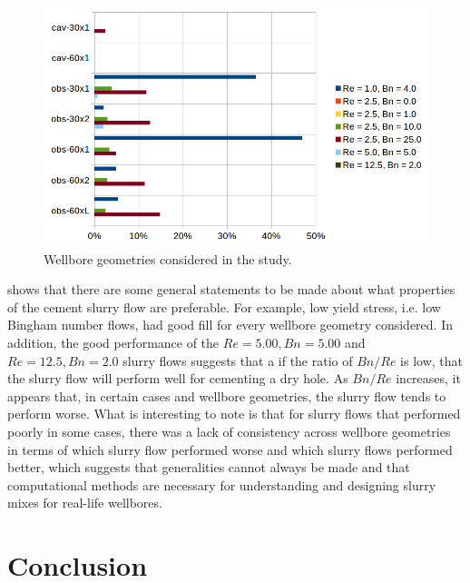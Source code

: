 \documentclass[pdftex,ms]{pittetd}
\begin{document}
\begin{figure}
\centering
\includegraphics[width=\linewidth]{figs/percent_filled}
\caption{Wellbore geometries considered in the study.}
\label{fig:percent-filled}
\end{figure}

 shows that there are some general statements to be made about what properties of the cement slurry flow are preferable.
For example, low yield stress, i.e. low Bingham number flows, had good fill for every wellbore geometry considered.
In addition, the good performance of the $Re = 5.00, Bn = 5.00$ and $Re = 12.5, Bn = 2.0$ slurry flows suggests that a if the ratio of $Bn / Re$ is low, that the slurry flow will perform well for cementing a dry hole.
As $Bn / Re$ increases, it appears that, in certain cases and wellbore geometries, the slurry flow tends to perform worse.
What is interesting to note is that for slurry flows that performed poorly in some cases, there was a lack of consistency across wellbore geometries in terms of which slurry flow performed worse and which slurry flows performed better, which suggests that generalities cannot always be made and that computational methods are necessary for understanding and designing slurry mixes for real-life wellbores.

\section{Conclusion} \label{sec:conclusion}
\end{document}

